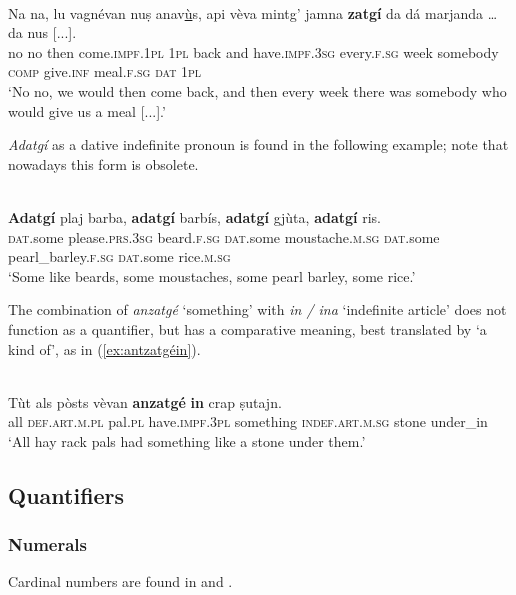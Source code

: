 \ea
\label{}
\\
 \gll Na na, lu vagnévan nuṣ anav\underline{ù}s, api vèva mintg’ jamna \textbf{zatgí} da dá marjanda … da nus [...].\\
 no no then come.\textsc{impf.1pl} \textsc{1pl} back and have.\textsc{impf.3sg} every.\textsc{f.sg}  week somebody \textsc{comp} give.\textsc{inf} meal.\textsc{f.sg} {} \textsc{dat} \textsc{1pl}\\
 \glt `No no, we would then come back, and then every week there was somebody who would give us a meal [...].'
 \z 
 
\textit{Adatgí} as a dative indefinite pronoun is found in the following example; note that nowadays this form is obsolete.

\ea\label{}
\\
\gll  \textbf{Adatgí} plaj barba, \textbf{adatgí} barbís, \textbf{adatgí} gjùta, \textbf{adatgí} ris. \\
\textsc{dat}.some please.\textsc{prs.3sg} beard.\textsc{f.sg}  \textsc{dat}.some moustache.\textsc{m.sg} \textsc{dat}.some pearl\_barley.\textsc{f.sg} \textsc{dat}.some rice.\textsc{m.sg} \\
\glt `Some like beards, some moustaches, some pearl barley, some rice.'
\z

The combination of \textit{anzatgé} `something' with \textit{in / ina} `indefinite article' does not function as a quantifier, but has a comparative meaning, best translated by `a kind of', as in (\ref{ex:antzatgéin}).

\ea\label{ex:antzatgéin}
\\
\gll   Tùt als pòsts vèvan \textbf{anzatgé} \textbf{in} crap ṣutajn.\\
all \textsc{def.art.m.pl} pal.\textsc{pl} have.\textsc{impf.3pl} something \textsc{indef.art.m.sg} stone under\_in\\
\glt `All hay rack pals had something like a stone under them.'
\z

\subsection{Quantifiers}

\subsubsection{Numerals}
Cardinal numbers are found in  and .


